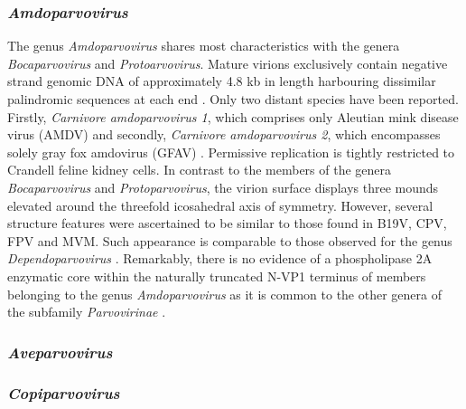 \subsubsection{\textit{Amdoparvovirus}}
The genus \textit{Amdoparvovirus} shares most characteristics with the genera \textit{Bocaparvovirus} and \textit{Protoarvovirus}. Mature virions exclusively contain negative strand genomic DNA of approximately 4.8 kb in length harbouring dissimilar palindromic sequences at each end \cite{pmid6252342, pmid2843669}. Only two distant species have been reported. Firstly, \textit{Carnivore amdoparvovirus 1}, which comprises only Aleutian mink disease virus (AMDV) and secondly, \textit{Carnivore amdoparvovirus 2}, which encompasses solely gray fox amdovirus (GFAV) \cite{pmid22000359}. 
Permissive replication is tightly restricted to Crandell feline kidney cells. In contrast to the members of the genera \textit{Bocaparvovirus} and \textit{Protoparvovirus}, the virion surface displays three mounds elevated around the threefold icosahedral axis of symmetry. However, several structure features were ascertained to be similar to those found in B19V, CPV, FPV and MVM. Such appearance is comparable to those observed for the genus \textit{Dependoparvovirus} \cite{pmid10400786}. Remarkably, there is no evidence of a phospholipase 2A enzymatic core within the naturally truncated N-VP1 terminus of members belonging to the genus \textit{Amdoparvovirus} as it is common to the other genera of the subfamily \textit{Parvovirinae} \cite{icvt}.       


\subsubsection{\textit{Aveparvovirus}}

\subsubsection{\textit{Copiparvovirus}}

